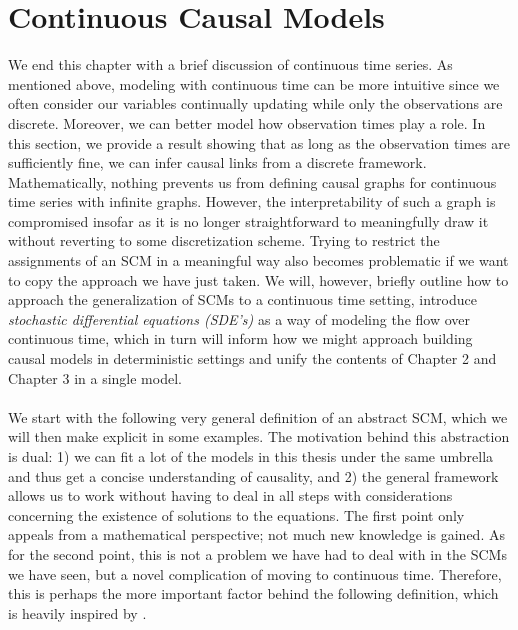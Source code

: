 \documentclass[11pt, a4paper]{memoir}
\theoremstyle{break}
\theoremstyle{break}
\theoremstyle{nonumberplain}
\begin{document}
\section{Continuous Causal Models}\label{contCaus}
We end this chapter with a brief discussion of continuous time series. As mentioned above, modeling with continuous time can be more intuitive since we often consider our variables continually updating while only the observations are discrete. Moreover, we can better model how observation times play a role. In this section, we provide a result showing that as long as the observation times are sufficiently fine, we can infer causal links from a discrete framework. Mathematically, nothing prevents us from defining causal graphs for continuous time series with infinite graphs. However, the interpretability of such a graph is compromised insofar as it is no longer straightforward to meaningfully draw it without reverting to some discretization scheme. Trying to restrict the assignments of an SCM in a meaningful way also becomes problematic if we want to copy the approach we have just taken. We will, however, briefly outline how to approach the generalization of SCMs to a continuous time setting, introduce \emph{stochastic differential equations (SDE's)} as a way of modeling the flow over continuous time, which in turn will inform how we might approach building causal models in deterministic settings and unify the contents of Chapter 2 and Chapter 3 in a single model.\\\\
We start with the following very general definition of an abstract SCM, which we will then make explicit in some examples. The motivation behind this abstraction is dual: 1) we can fit a lot of the models in this thesis under the same umbrella and thus get a concise understanding of causality, and 2) the general framework allows us to work without having to deal in all steps with considerations concerning the existence of solutions to the equations. The first point only appeals from a mathematical perspective; not much new knowledge is gained. As for the second point, this is not a problem we have had to deal with in the SCMs we have seen, but a novel complication of moving to continuous time. Therefore, this is perhaps the more important factor behind the following definition, which is heavily inspired by \cite{SCMGen}.
\end{document}
